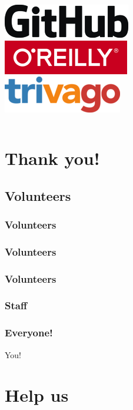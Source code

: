 \documentclass[aspectratio=169]{beamer}
\begin{document}
\begin{frame}
\begin{columns}[t]
		\includegraphics[scale=0.5]{images/github.png}\\
		\includegraphics[scale=0.4]{images/oreilly.png}\\
		\includegraphics[scale=0.4]{images/trivago.png}
	\end{columns}
\end{frame}

\section{Thank you!}

\subsection{Volunteers}

\begin{frame}
	\frametitle{Volunteers}
\end{frame}

\begin{frame}
	\frametitle{Volunteers}
\end{frame}

\begin{frame}
	\frametitle{Volunteers}
\end{frame}

\begin{frame}
	\frametitle{Staff}
	\vfill
	\vfill
\end{frame}

\begin{frame}
	\frametitle{Everyone!}
	\vfill
	\begin{center}
	{\Huge You!}
	\end{center}
	\vfill
\end{frame}


\section{Help us}
\end{document}
